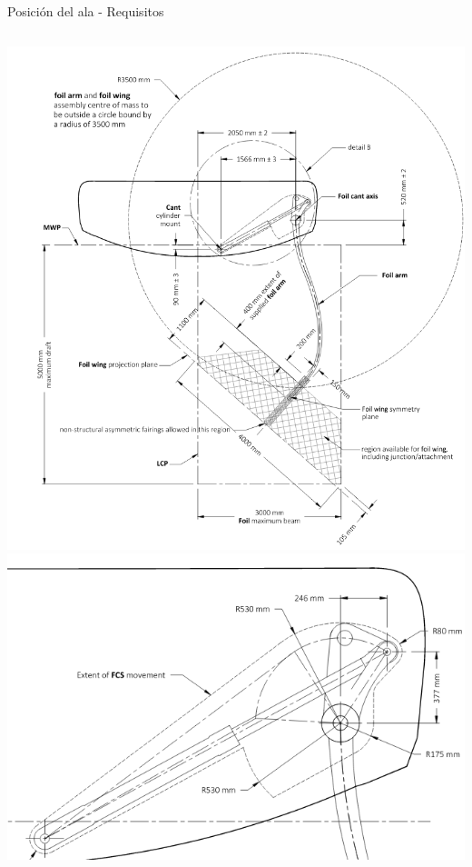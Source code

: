 \documentclass[presentation,aspectratio=169]{beamer}
\begin{document}
\begin{frame}[label={sec:org4c92ef2}]{Posición del ala - Requisitos}
\begin{columns}
\begin{column}{0.5\columnwidth}
\begin{center}
\includegraphics[height=0.6\textheight]{../../figures/ac75-class-foil.png}\\[-4mm]
\includegraphics[height=0.3\textheight]{../../figures/ac75-rule-detail.png}
\end{center}
\end{column}


\end{columns}
\end{frame}
\end{document}
